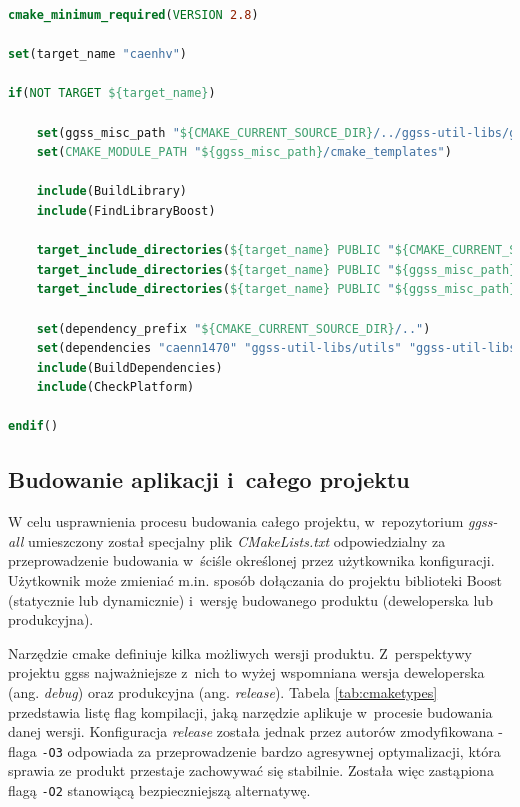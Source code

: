 \newpage

\begin{lstlisting}[language=cmake, caption={Plik \textit{CMakeLists.txt} służący do budowania biblioteki \textit{caenhv}. Widoczne zastosowanie m.in. plików \textit{BuildLibrary.cmake} oraz \textit{BuildDependencies.cmake}.},label={lst:caenhvcmake}]
cmake_minimum_required(VERSION 2.8)

set(target_name "caenhv")

if(NOT TARGET ${target_name})
   
    set(ggss_misc_path "${CMAKE_CURRENT_SOURCE_DIR}/../ggss-util-libs/ggss-misc")
    set(CMAKE_MODULE_PATH "${ggss_misc_path}/cmake_templates")

    include(BuildLibrary)
    include(FindLibraryBoost)

    target_include_directories(${target_name} PUBLIC "${CMAKE_CURRENT_SOURCE_DIR}/include/CaenHVLib")
    target_include_directories(${target_name} PUBLIC "${ggss_misc_path}/include")
    target_include_directories(${target_name} PUBLIC "${ggss_misc_path}")

    set(dependency_prefix "${CMAKE_CURRENT_SOURCE_DIR}/..")
    set(dependencies "caenn1470" "ggss-util-libs/utils" "ggss-util-libs/thread")
    include(BuildDependencies)
    include(CheckPlatform)

endif()
\end{lstlisting}



\subsection{Budowanie aplikacji i~całego projektu} 
W celu usprawnienia procesu budowania całego projektu, w~repozytorium \textit{ggss-all} umieszczony został specjalny plik \textit{CMakeLists.txt} odpowiedzialny za przeprowadzenie budowania w~ściśle określonej przez użytkownika konfiguracji. Użytkownik może zmieniać m.in. sposób dołączania do projektu biblioteki Boost (statycznie lub dynamicznie) i~wersję budowanego produktu (deweloperska lub produkcyjna). 

Narzędzie \gls*{cmake} definiuje kilka możliwych wersji produktu. Z~perspektywy projektu \gls*{ggss} najważniejsze z~nich to wyżej wspomniana wersja deweloperska (ang. \textit{debug}) oraz produkcyjna (ang. \textit{release}). Tabela \ref{tab:cmaketypes} przedstawia listę flag kompilacji, jaką narzędzie aplikuje w~procesie budowania danej wersji. Konfiguracja \textit{release} została jednak przez autorów zmodyfikowana - flaga \lstinline{-O3} odpowiada za przeprowadzenie bardzo agresywnej optymalizacji, która sprawia ze produkt przestaje zachowywać się stabilnie. Została więc zastąpiona flagą \lstinline{-O2} stanowiącą bezpieczniejszą alternatywę. 




